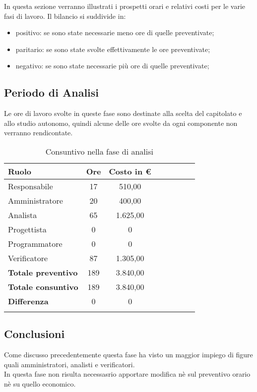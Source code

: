 \documentclass[../piano_di_progetto.tex]{subfiles}
\begin{document}
In questa sezione verranno illustrati i prospetti orari e relativi costi per le varie fasi di lavoro. Il bilancio si suddivide in:
\begin{itemize}
\item positivo: se sono state necessarie meno ore di quelle preventivate;
\item paritario: se sono state svolte effettivamente le ore preventivate;
\item negativo: se sono state necessarie più ore di quelle preventivate;
\end{itemize}

\subsection{ Periodo di Analisi}%
\label{sub:cons_analisi}
Le ore di lavoro svolte in queste fase sono destinate alla scelta del capitolato e allo studio autonomo, quindi alcune delle ore svolte da ogni componente non verranno rendicontate.

\begin{center}
	\begin{longtable}{|l|c|c|c|c|c|c|c|}
		\hline
		\rowcolor{lightgray}
		\textbf{Ruolo} & \textbf{Ore} & \textbf{Costo in €}\\
		\hline
		Responsabile & 17 & 510,00 \\
		\hline
		Amministratore & 20 & 400,00 \\
		\hline
		Analista & 65 & 1.625,00 \\
		\hline
		Progettista & 0 & 0 \\
		\hline
		Programmatore & 0 & 0 \\
		\hline
		Verificatore & 87 & 1.305,00 \\
		\hline
		\textbf{Totale preventivo} & 189 & 3.840,00 \\
		\hline
		\textbf{Totale consuntivo} & 189 & 3.840,00 \\
		\hline
		\textbf{Differenza} & 0 & 0\\
		\hline	
		\caption{Consuntivo nella fase di analisi}
	\end{longtable}
\end{center}

\subsection{ Conclusioni}%
\label{sub:cons_fine}
Come discusso precedentemente questa fase ha visto un maggior impiego di figure quali amministratori, analisti e verificatori.\\
In questa fase non risulta necessasrio apportare modifica nè sul preventivo orario nè su quello economico. 
\end{document}
